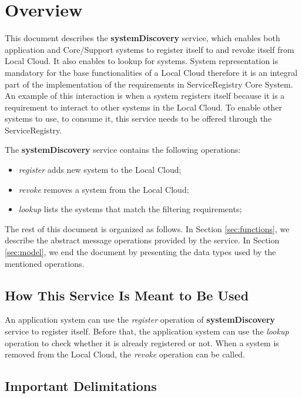 \documentclass[a4paper]{arrowhead}
\begin{document}
\section{Overview}
\label{sec:overview}
This document describes the \textbf{systemDiscovery} service, which enables both application and Core/Support systems to register itself to and revoke itself from Local Cloud. It also enables to lookup for systems. System representation is mandatory for the base functionalities of a Local Cloud therefore it is an integral part of the implementation of the requirements in ServiceRegistry Core System. An example of this interaction is when a system registers itself because it is a requirement to interact to other systems in the Local Cloud. To enable other systems to use, to consume it, this service needs to be offered through the ServiceRegistry.

The \textbf{systemDiscovery} service contains the following operations:

\begin{itemize}
    \item \textit{register} adds new system to the Local Cloud;
    \item \textit{revoke} removes a system from the Local Cloud;
    \item \textit{lookup} lists the systems that match the filtering requirements;
\end{itemize}

The rest of this document is organized as follows.
In Section \ref{sec:functions}, we describe the abstract message operations provided by the service.
In Section \ref{sec:model}, we end the document by presenting the data types used by the mentioned operations.

\subsection{How This Service Is Meant to Be Used}
An application system can use the \textit{register} operation of \textbf{systemDiscovery} service to register itself. Before that, the application system can use the \textit{lookup} operation to check whether it is already registered or not. When a system is removed from the Local Cloud, the \textit{revoke} operation can be called.

\subsection{Important Delimitations}
\label{sec:delimitations}
\end{document}
